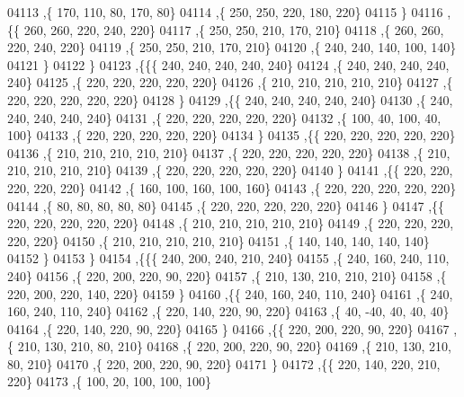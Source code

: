 \begin{DoxyCode}
04113     ,\{   170,   110,    80,   170,    80\}
04114     ,\{   250,   250,   220,   180,   220\}
04115     \}
04116    ,\{\{   260,   260,   220,   240,   220\}
04117     ,\{   250,   250,   210,   170,   210\}
04118     ,\{   260,   260,   220,   240,   220\}
04119     ,\{   250,   250,   210,   170,   210\}
04120     ,\{   240,   240,   140,   100,   140\}
04121     \}
04122    \}
04123   ,\{\{\{   240,   240,   240,   240,   240\}
04124     ,\{   240,   240,   240,   240,   240\}
04125     ,\{   220,   220,   220,   220,   220\}
04126     ,\{   210,   210,   210,   210,   210\}
04127     ,\{   220,   220,   220,   220,   220\}
04128     \}
04129    ,\{\{   240,   240,   240,   240,   240\}
04130     ,\{   240,   240,   240,   240,   240\}
04131     ,\{   220,   220,   220,   220,   220\}
04132     ,\{   100,    40,   100,    40,   100\}
04133     ,\{   220,   220,   220,   220,   220\}
04134     \}
04135    ,\{\{   220,   220,   220,   220,   220\}
04136     ,\{   210,   210,   210,   210,   210\}
04137     ,\{   220,   220,   220,   220,   220\}
04138     ,\{   210,   210,   210,   210,   210\}
04139     ,\{   220,   220,   220,   220,   220\}
04140     \}
04141    ,\{\{   220,   220,   220,   220,   220\}
04142     ,\{   160,   100,   160,   100,   160\}
04143     ,\{   220,   220,   220,   220,   220\}
04144     ,\{    80,    80,    80,    80,    80\}
04145     ,\{   220,   220,   220,   220,   220\}
04146     \}
04147    ,\{\{   220,   220,   220,   220,   220\}
04148     ,\{   210,   210,   210,   210,   210\}
04149     ,\{   220,   220,   220,   220,   220\}
04150     ,\{   210,   210,   210,   210,   210\}
04151     ,\{   140,   140,   140,   140,   140\}
04152     \}
04153    \}
04154   ,\{\{\{   240,   200,   240,   210,   240\}
04155     ,\{   240,   160,   240,   110,   240\}
04156     ,\{   220,   200,   220,    90,   220\}
04157     ,\{   210,   130,   210,   210,   210\}
04158     ,\{   220,   200,   220,   140,   220\}
04159     \}
04160    ,\{\{   240,   160,   240,   110,   240\}
04161     ,\{   240,   160,   240,   110,   240\}
04162     ,\{   220,   140,   220,    90,   220\}
04163     ,\{    40,   -40,    40,    40,    40\}
04164     ,\{   220,   140,   220,    90,   220\}
04165     \}
04166    ,\{\{   220,   200,   220,    90,   220\}
04167     ,\{   210,   130,   210,    80,   210\}
04168     ,\{   220,   200,   220,    90,   220\}
04169     ,\{   210,   130,   210,    80,   210\}
04170     ,\{   220,   200,   220,    90,   220\}
04171     \}
04172    ,\{\{   220,   140,   220,   210,   220\}
04173     ,\{   100,    20,   100,   100,   100\}

\end{DoxyCode}
